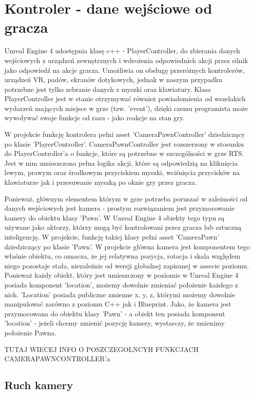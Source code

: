 \documentclass[12pt]{report}
\begin{document}
\section{Kontroler - dane wejściowe od gracza}
Unreal Engine 4 udostępnia klasę c++ - PlayerController, do zbierania danych wejściowych z urządzeń zewnętrznych i wdrożenia odpowiednich akcji przez silnik jako odpowiedź na akcje gracza. Umożliwia on obsługę przeróżnych kontrolerów, urządzeń VR, padów, ekranów dotykowych, jednak w naszym przypadku potrzebne jest tylko zebranie danych z myszki oraz klawiatury. Klasa PlayerController jest w stanie otrzymywać również powiadomienia od wszelakich wydarzeń mających miejsce w grze (tzw. 'event'), dzięki czemu programista może wywoływać swoje funkcje od razu - jako reakcje na stan gry.

W projekcie funkcję kontrolera pełni asset 'CameraPawnController' dziedziczący po klasie 'PlayerController'. CameraPawnController jest rozszerzony w stosunku do PlayerController'a o funkcje, które są potrzebne w szczególności w grze RTS. Jest w nim umieszczona pełna logika akcji, które są odpowiedzią na kliknięcia lewym, prawym oraz środkowym przyciskiem myszki, wciśnięcia przycisków na klawiaturze jak i przesuwanie myszką po oknie gry przez gracza.

Ponieważ, głównym elementem którym w grze potrzeba poruszać w zależności od danych wejściowych jest kamera - prostym rozwiązaniem jest przymocowanie kamery do obiektu klasy 'Pawn'. W Unreal Engine 4 obiekty tego typu są używane jako aktorzy, którzy mogą być kontrolowani przez gracza lub sztuczną inteligencję. W projekcie, funkcję takiej klasy pełni asset 'CameraPawn' dziedziczący po klasie 'Pawn'. W projekcie główna kamera jest komponentem tego właśnie obiektu, co oznacza, że jej relatywna pozycja, rotacja i skala względem niego pozostaje stała, niezależnie od wersji globalnej zapisanej w assecie poziomu. Ponieważ każdy obiekt, który jest umieszczony w poziomie w Unreal Engine 4 posiada komponent 'location', możemy dowolnie zmieniać położenie każdego z nich. 'Location' posiada publiczne zmienne x, y, z, którymi możemy dowolnie manipulować zarówno z poziomu C++ jak i Blueprint. Jako, że kamera jest przymocowana do obiektu klasy 'Pawn' - a obiekt ten posiada komponent 'location' - jeżeli chcemy zmienić pozycję kamery, wystarczy, że zmienimy położenie Pawna.

TUTAJ WIECEJ INFO O POSZCZEGOLNCYH FUNKCJACH CAMERAPAWNCONTROLLER'a

\subsection{Ruch kamery}
\end{document}
